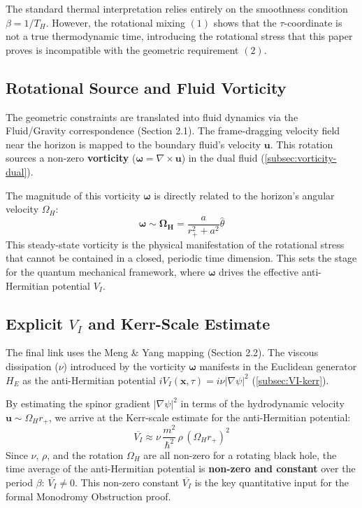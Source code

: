 \documentclass[11pt]{article}
\begin{document}
The standard thermal interpretation relies entirely on the smoothness condition $\beta = 1/T_H$. However, the rotational mixing $(1)$ shows that the $\tau$-coordinate is not a true thermodynamic time, introducing the rotational stress that this paper proves is incompatible with the geometric requirement $(2)$.

\subsection{Rotational Source and Fluid Vorticity}

The geometric constraints are translated into fluid dynamics via the Fluid/Gravity correspondence (Section 2.1). The frame-dragging velocity field near the horizon is mapped to the boundary fluid's velocity $\mathbf{u}$. This rotation sources a non-zero \textbf{vorticity} ($\mathbf{\omega} = \nabla \times \mathbf{u}$) in the dual fluid (\autoref{subsec:vorticity-dual}).

The magnitude of this vorticity $\mathbf{\omega}$ is directly related to the horizon's angular velocity $\Omega_H$:
\begin{equation}\label{eq:omega_scaling}
    \mathbf{\omega} \sim \mathbf{\Omega_H} = \frac{a}{r_+^2 + a^2} \hat{\theta}
\end{equation}
This steady-state vorticity is the physical manifestation of the rotational stress that cannot be contained in a closed, periodic time dimension. This sets the stage for the quantum mechanical framework, where $\mathbf{\omega}$ drives the effective anti-Hermitian potential $V_I$.

\subsection{Explicit $V_I$ and Kerr-Scale Estimate}
\label{subsec:VI-kerr}

The final link uses the Meng \& Yang mapping (Section 2.2). The viscous dissipation ($\nu$) introduced by the vorticity $\mathbf{\omega}$ manifests in the Euclidean generator $H_E$ as the anti-Hermitian potential $iV_I(\mathbf{x}, \tau) = i\nu|\nabla\psi|^2$ (\autoref{subsec:VI-kerr}).

By estimating the spinor gradient $|\nabla\psi|^2$ in terms of the hydrodynamic velocity $\mathbf{u} \sim \Omega_H r_+$, we arrive at the Kerr-scale estimate for the anti-Hermitian potential:
\begin{equation}\label{eq:VI_kerr}
    \overline{V_I} \approx \nu\,\frac{m^2}{\hbar^2}\,\rho\,(\Omega_H r_+)^2
\end{equation}
Since $\nu$, $\rho$, and the rotation $\Omega_H$ are all non-zero for a rotating black hole, the time average of the anti-Hermitian potential is \textbf{non-zero and constant} over the period $\beta$: $\overline{V_I} \neq 0$. This non-zero constant $\overline{V_I}$ is the key quantitative input for the formal Monodromy Obstruction proof.
\end{document}
